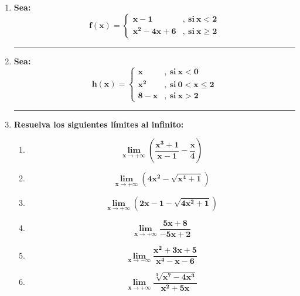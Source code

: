 \documentclass[12pt]{article}
\begin{document}
\begin{enumerate}[label=\textbf{\arabic*.}]
            \vspace{1cm}\hrule
            \item \textbf{Sea: }
                \[
                    \boldsymbol{
                        f(x) = 
                        \left\{
                            \begin{array}{ll}
                                x - 1 & ,\ \text{si} \ x < 2 \\
                                x ^2 - 4x + 6 & ,\ \text{si} \ x \geq 2
                            \end{array}
                        \right.
                    }
                \]

            \vspace{1cm}\hrule
            \item \textbf{Sea: }
                \[
                    \boldsymbol{
                        h(x) = 
                        \left\{
                            \begin{array}{ll}
                                x & ,\ \text{si} \ x < 0 \\
                                x ^2 & ,\ \text{si} \ 0 < x \leq 2 \\
                                8 - x & ,\ \text{si} \ x > 2
                            \end{array}
                        \right.
                    }
                \]
            
            
            \vspace{1cm}\hrule
            \item \textbf{Resuelva los siguientes límites al infinito:}
                \begin{enumerate}[label=\textbf{\arabic*)}] 
                    \item \[\bm{\lim_{x \to +\infty} \left( \frac{x^3 + 1}{x - 1} - \frac{x}{4} \right)}\]
                    \item \[\bm{\lim_{x \to +\infty} \left( 4x^2 - \sqrt{x^4 + 1} \right)}\]
                    \item \[\bm{\lim_{x \to +\infty} \left( 2x - 1 - \sqrt{4x^2 + 1} \right)}\]
                    \item \[\bm{\lim_{x \to +\infty} \frac{5x + 8}{-5x + 2}}\]
                    \item \[\bm{\lim_{x \to -\infty} \frac{x^2 + 3x + 5}{x^4 - x - 6}}\]
                    \item \[\bm{\lim_{x \to +\infty} \frac{\sqrt[3]{x^7 - 4x^3}}{x^2 + 5x}}\]
                \end{enumerate}

        
        \end{enumerate}
\end{document}
